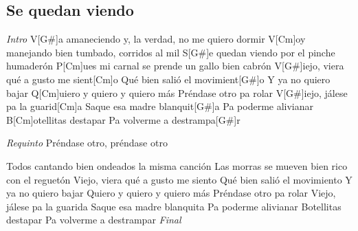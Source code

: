 \subsection{Se quedan viendo}
\noindent

\vspace{1cm}

\begin{guitar}
	\begin{multicols}{2}
		\textit{Intro}
		V[G#]a amaneciendo y, la verdad, no me quiero dormir
		V[Cm]oy manejando bien tumbado, corridos al mil
		S[G#]e quedan viendo por el pinche humaderón
		P[Cm]ues mi carnal se prende un gallo bien cabrón
		V[G#]iejo, viera qué a gusto me sient[Cm]o
		Qué bien salió el movimient[G#]o
		Y ya no quiero bajar
		Q[Cm]uiero y quiero y quiero más
		Préndase otro pa rolar
		V[G#]iejo, jálese pa la guarid[Cm]a
		Saque esa madre blanquit[G#]a
		Pa poderme alivianar
		B[Cm]otellitas destapar
		Pa volverme a destrampa[G#]r
		\par
		
	\textit{Requinto}
		Préndase otro, préndase otro
	\par
	Todos cantando bien ondeados la misma canción
	Las morras se mueven bien rico con el reguetón
	Viejo, viera qué a gusto me siento
	Qué bien salió el movimiento
	Y ya no quiero bajar
	Quiero y quiero y quiero más
	Préndase otro pa rolar
	Viejo, jálese pa la guarida
	Saque esa madre blanquita
	Pa poderme alivianar
	Botellitas destapar
	Pa volverme a destrampar
		\textit{Final}
		\end{multicols}
\end{guitar}
